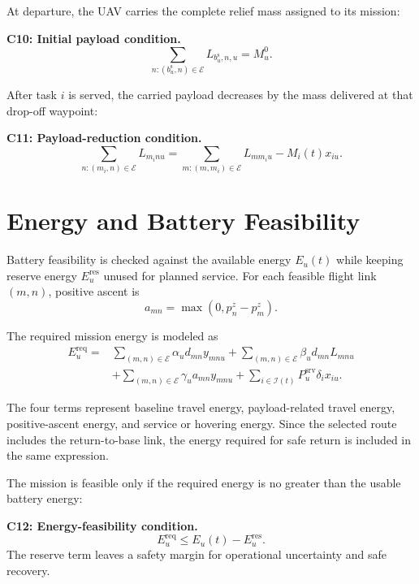 At departure, the UAV carries the complete relief mass assigned to its
mission:

\noindent\textbf{C10: Initial payload condition.}
\begin{equation*}
\sum_{n:(b_u^{\mathrm{s}},n)\in\mathcal{E}}
L_{b_u^{\mathrm{s}},n,u}
=
M_u^0.
\end{equation*}

After task $i$ is served, the carried payload decreases by the mass delivered
at that drop-off waypoint:

\noindent\textbf{C11: Payload-reduction condition.}
\begin{equation*}
\sum_{n:(m_i,n)\in\mathcal{E}}
L_{m_i n u}
=
\sum_{m:(m,m_i)\in\mathcal{E}}
L_{m m_i u}
-
M_i(t)x_{iu}.
\end{equation*}

\section{Energy and Battery Feasibility}

Battery feasibility is checked against the available energy $E_u(t)$ while
keeping reserve energy $E_u^{\mathrm{res}}$ unused for planned service. For
each feasible flight link $(m,n)$, positive ascent is
\begin{equation}
a_{mn}
=
\max(0,p_n^z-p_m^z).
\end{equation}

The required mission energy is modeled as
\begin{equation}
\begin{aligned}
E_u^{\mathrm{req}}
=&
\sum_{(m,n)\in\mathcal{E}}
\alpha_u d_{mn}y_{mnu}
+
\sum_{(m,n)\in\mathcal{E}}
\beta_u d_{mn}L_{mnu}
\\
&+
\sum_{(m,n)\in\mathcal{E}}
\gamma_u a_{mn}y_{mnu}
+
\sum_{i\in\mathcal{I}(t)}
P_u^{\mathrm{srv}}\delta_i x_{iu}.
\end{aligned}
\end{equation}

The four terms represent baseline travel energy, payload-related travel
energy, positive-ascent energy, and service or hovering energy. Since the
selected route includes the return-to-base link, the energy required for safe
return is included in the same expression.

The mission is feasible only if the required energy is no greater than the
usable battery energy:

\noindent\textbf{C12: Energy-feasibility condition.}
\begin{equation*}
E_u^{\mathrm{req}}
\leq
E_u(t)-E_u^{\mathrm{res}}.
\end{equation*}
The reserve term leaves a safety margin for operational uncertainty and safe
recovery.


